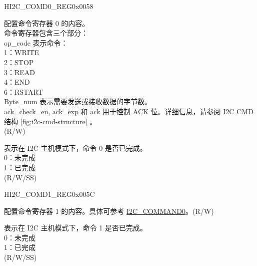     \begin{register}{H}{I2C\_COMD0\_REG}{0x0058}\label{regdesc:I2CCOMD0REG}
    \regnewline%
    \begin{regdesc}\begin{reglist}
    \label{fielddesc:I2CCOMMAND0}\item [I2C\_COMMAND0] 配置命令寄存器 0 的内容。 \\
    命令寄存器包含三个部分：\\
    op\_code 表示命令：\\
    1：WRITE\\
    2：STOP\\
    3：READ\\
    4：END\\
    6：RSTART\\
    Byte\_num 表示需要发送或接收数据的字节数。\\
    ack\_check\_en, ack\_exp 和 ack 用于控制 ACK 位。详细信息，请参阅 I2C CMD 结构 \ref{fig:i2c-cmd-structure} 。\\(R/W)
    \label{fielddesc:I2CCOMMAND0DONE}\item [I2C\_COMMAND0\_DONE] 表示在 I2C 主机模式下，命令 0 是否已完成。\\
    0：未完成\\
    1：已完成 \\ (R/W/SS)
    \end{reglist}\end{regdesc}
    \end{register}


    \begin{register}{H}{I2C\_COMD1\_REG}{0x005C}\label{regdesc:I2CCOMD1REG}
    \regnewline%
    \begin{regdesc}\begin{reglist}
    \label{fielddesc:I2CCOMMAND1}\item [I2C\_COMMAND1] 配置命令寄存器 1 的内容。具体可参考 \hyperref[fielddesc:I2CCOMMAND0]{I2C\_COMMAND0}。(R/W)
    \label{fielddesc:I2CCOMMAND1DONE}\item [I2C\_COMMAND1\_DONE] 表示在 I2C 主机模式下，命令 1 是否已完成。\\
    0：未完成\\
    1：已完成 \\ (R/W/SS)
    \end{reglist}\end{regdesc}
    \end{register}


